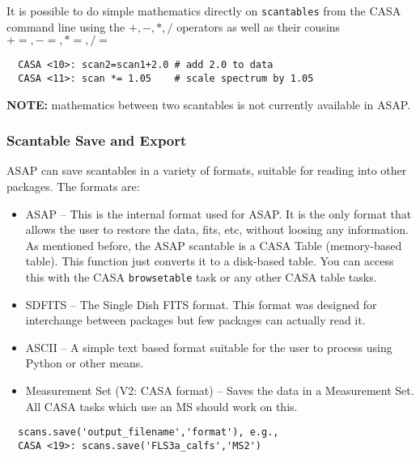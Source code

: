 It is possible to do simple mathematics directly on {\tt scantables}
from the CASA command line using the $+,-,*,/$ operators as well as
their cousins $+=, -=, *=, /=$

\small
\begin{verbatim}
  CASA <10>: scan2=scan1+2.0 # add 2.0 to data 
  CASA <11>: scan *= 1.05    # scale spectrum by 1.05 
\end{verbatim}
\normalsize

{\bf NOTE:} mathematics between two scantables is not currently
available in ASAP.

\subsubsection{Scantable Save and Export}
\label{subsubsection:sd.asap.scantable.export}

ASAP can save scantables in a variety of formats, suitable for reading
into other packages. The formats are: 

\begin{itemize}
    \item ASAP -- This is the internal format used for ASAP. It is the only
     format that allows the user to restore the data, fits, etc,
     without loosing any information. As mentioned before, the ASAP
     scantable is a CASA Table (memory-based table). This function
     just converts it to a disk-based table. You can access this with
     the CASA {\tt browsetable} task or any other CASA table tasks. 

   \item SDFITS -- The Single Dish FITS format. This format was designed
     for interchange between packages but few packages can actually
     read it. 

   \item ASCII -- A simple text based format suitable for the user to
     process using Python or other means. 

   \item Measurement Set (V2: CASA format) -- Saves the data in a
     Measurement Set. All CASA tasks which use an MS should work on
     this. 
\end{itemize}

\small
\begin{verbatim}
  scans.save('output_filename','format'), e.g.,
  CASA <19>: scans.save('FLS3a_calfs','MS2')
\end{verbatim}
\normalsize

